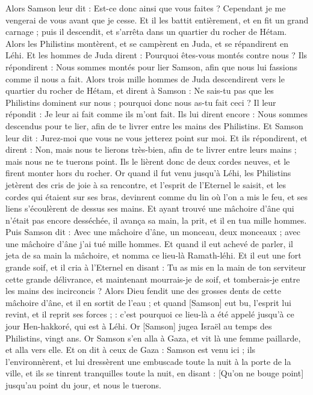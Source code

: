 \begin{multicols}{2}
Alors Samson leur dit : Est-ce donc ainsi que vous faites ? Cependant je me vengerai de vous avant que je cesse.
Et il les battit entièrement, et en fit un grand carnage ; puis il descendit, et s'arrêta dans un quartier du rocher de Hétam.
Alors les Philistins montèrent, et se campèrent en Juda, et se répandirent en Léhi.
Et les hommes de Juda dirent : Pourquoi êtes-vous montés contre nous ? Ils répondirent : Nous sommes montés pour lier Samson, afin que nous lui fassions comme il nous a fait.
Alors trois mille hommes de Juda descendirent vers le quartier du rocher de Hétam, et dirent à Samson : Ne sais-tu pas que les Philistins dominent sur nous ; pourquoi donc nous as-tu fait ceci ? Il leur répondit : Je leur ai fait comme ils m'ont fait.
Ils lui dirent encore : Nous sommes descendus pour te lier, afin de te livrer entre les mains des Philistins. Et Samson leur dit : Jurez-moi que vous ne vous jetterez point sur moi.
Et ils répondirent, et dirent : Non, mais nous te lierons très-bien, afin de te livrer entre leurs mains ; mais nous ne te tuerons point. Ils le lièrent donc de deux cordes neuves, et le firent monter hors du rocher.
Or quand il fut venu jusqu'à Léhi, les Philistins jetèrent des cris de joie à sa rencontre, et l'esprit de l'Eternel le saisit, et les cordes qui étaient sur ses bras, devinrent comme du lin où l'on a mis le feu, et ses liens s'écoulèrent de dessus ses mains.
Et ayant trouvé une mâchoire d'âne qui n'était pas encore desséchée, il avança sa main, la prit, et il en tua mille hommes.
Puis Samson dit : Avec une mâchoire d'âne, un monceau, deux monceaux ; avec une mâchoire d'âne j'ai tué mille hommes.
Et quand il eut achevé de parler, il jeta de sa main la mâchoire, et nomma ce lieu-là Ramath-léhi.
Et il eut une fort grande soif, et il cria à l'Eternel en disant : Tu as mis en la main de ton serviteur cette grande délivrance, et maintenant mourrais-je de soif, et tomberais-je entre les mains des incirconcis ?
Alors Dieu fendit une des grosses dents de cette mâchoire d'âne, et il en sortit de l'eau ; et quand [Samson] eut bu, l'esprit lui revint, et il reprit ses forces ; : c'est pourquoi ce lieu-là a été appelé jusqu'à ce jour Hen-hakkoré, qui est à Léhi.
Or [Samson] jugea Israël au temps des Philistins, vingt ans.
\VerseOne{}Or Samson s'en alla à Gaza, et vit là une femme paillarde, et alla vers elle.
Et on dit à ceux de Gaza : Samson est venu ici ; ils l'environnèrent, et lui dressèrent une embuscade toute la nuit à la porte de la ville, et ils se tinrent tranquilles toute la nuit, en disant : [Qu'on ne bouge point] jusqu'au point du jour, et nous le tuerons.

\end{multicols}
